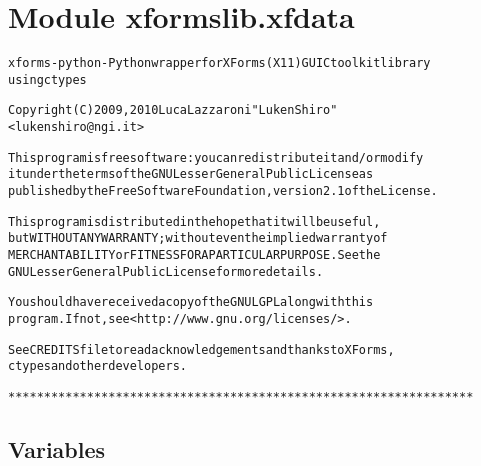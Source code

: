 %
%
%


\section{Module xformslib.xfdata}

    \label{xformslib:xfdata}
\begin{alltt}

xforms-python - Python wrapper for XForms (X11) GUI C toolkit library
using ctypes

Copyright (C) 2009, 2010  Luca Lazzaroni "LukenShiro"
    {\textless}lukenshiro@ngi.it{\textgreater}

This program is free software: you can redistribute it and/or modify
it under the terms of the GNU Lesser General Public License as
published by the Free Software Foundation, version 2.1 of the License.

This program is distributed in the hope that it will be useful,
but WITHOUT ANY WARRANTY; without even the implied warranty of
MERCHANTABILITY or FITNESS FOR A PARTICULAR PURPOSE. See the
GNU Lesser General Public License for more details.

You should have received a copy of the GNU LGPL along with this
program. If not, see {\textless}http://www.gnu.org/licenses/{\textgreater}.

See CREDITS file to read acknowledgements and thanks to XForms,
ctypes and other developers.

*****************************************************************
\end{alltt}



  \subsection{Variables}

